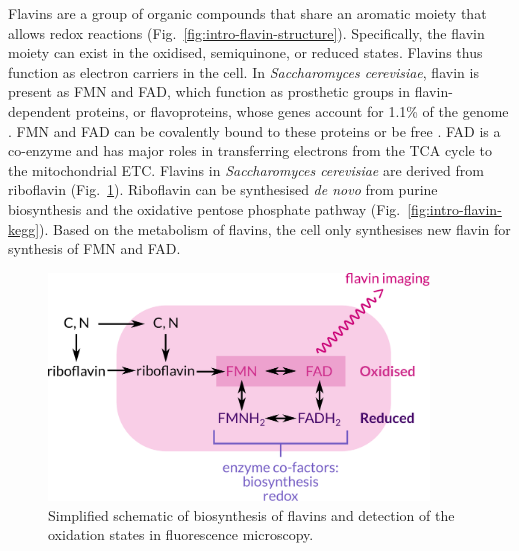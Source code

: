 Flavins are a group of organic compounds that share an aromatic moiety that allows redox reactions (Fig.\ \ref{fig:intro-flavin-structure}).
Specifically, the flavin moiety can exist in the oxidised, semiquinone, or reduced states.
Flavins thus function as electron carriers in the cell.
In \textit{Saccharomyces cerevisiae}, flavin is present as FMN and FAD, which function as prosthetic groups in flavin-dependent proteins, or flavoproteins, whose genes account for 1.1\% of the genome \parencite{gudipatiFlavoproteomeYeastSaccharomyces2014}.
FMN and FAD can be covalently bound to these proteins or be free \parencite{mewiesCovalentAttachmentFlavin1998}.
FAD is a co-enzyme and has major roles in transferring electrons from the TCA cycle to the mitochondrial ETC.
Flavins in \textit{Saccharomyces cerevisiae} are derived from riboflavin (Fig.\ \ref{fig:intro-flavin-schematic}).
Riboflavin can be synthesised \textit{de novo} from purine biosynthesis and the oxidative pentose phosphate pathway (Fig.\ \ref{fig:intro-flavin-kegg}).
Based on the metabolism of flavins, the cell only synthesises new flavin for synthesis of FMN and FAD.


\begin{figure}
  \centering
  \includegraphics[width=0.9\textwidth]{flavin-cell-schematic}
  \caption[
    Simplified schematic of biosynthesis of flavins
  ]{
    Simplified schematic of biosynthesis of flavins and detection of the oxidation states in fluorescence microscopy.
    }
  \label{fig:intro-flavin-schematic}
\end{figure}

